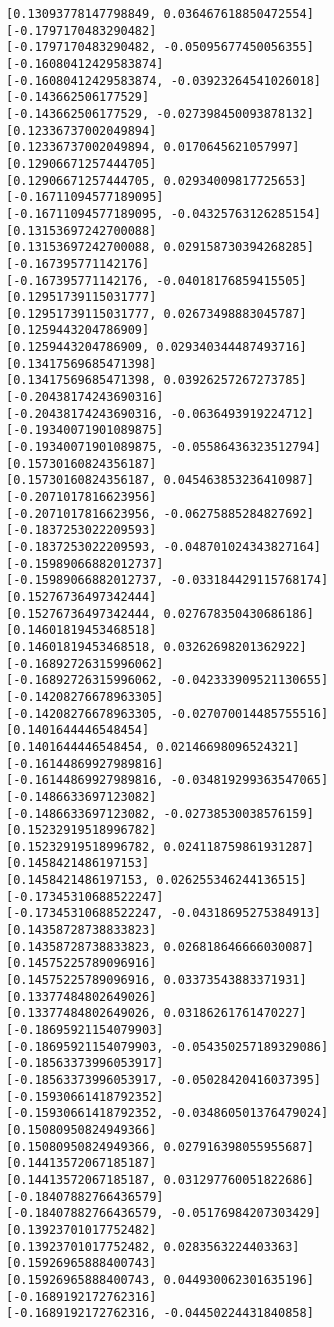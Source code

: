 \documentclass[11pt]{article}
\begin{document}
\begin{Verbatim}[commandchars=\\\{\}]
[0.13093778147798849, 0.036467618850472554]
[-0.1797170483290482]
[-0.1797170483290482, -0.05095677450056355]
[-0.16080412429583874]
[-0.16080412429583874, -0.03923264541026018]
[-0.143662506177529]
[-0.143662506177529, -0.027398450093878132]
[0.12336737002049894]
[0.12336737002049894, 0.0170645621057997]
[0.12906671257444705]
[0.12906671257444705, 0.02934009817725653]
[-0.16711094577189095]
[-0.16711094577189095, -0.04325763126285154]
[0.13153697242700088]
[0.13153697242700088, 0.029158730394268285]
[-0.167395771142176]
[-0.167395771142176, -0.04018176859415505]
[0.12951739115031777]
[0.12951739115031777, 0.02673498883045787]
[0.1259443204786909]
[0.1259443204786909, 0.029340344487493716]
[0.13417569685471398]
[0.13417569685471398, 0.03926257267273785]
[-0.20438174243690316]
[-0.20438174243690316, -0.0636493919224712]
[-0.19340071901089875]
[-0.19340071901089875, -0.05586436323512794]
[0.15730160824356187]
[0.15730160824356187, 0.045463853236410987]
[-0.2071017816623956]
[-0.2071017816623956, -0.06275885284827692]
[-0.1837253022209593]
[-0.1837253022209593, -0.048701024343827164]
[-0.15989066882012737]
[-0.15989066882012737, -0.033184429115768174]
[0.15276736497342444]
[0.15276736497342444, 0.027678350430686186]
[0.14601819453468518]
[0.14601819453468518, 0.03262698201362922]
[-0.16892726315996062]
[-0.16892726315996062, -0.042333909521130655]
[-0.14208276678963305]
[-0.14208276678963305, -0.027070014485755516]
[0.1401644446548454]
[0.1401644446548454, 0.02146698096524321]
[-0.16144869927989816]
[-0.16144869927989816, -0.034819299363547065]
[-0.1486633697123082]
[-0.1486633697123082, -0.02738530038576159]
[0.15232919518996782]
[0.15232919518996782, 0.024118759861931287]
[0.1458421486197153]
[0.1458421486197153, 0.026255346244136515]
[-0.17345310688522247]
[-0.17345310688522247, -0.04318695275384913]
[0.14358728738833823]
[0.14358728738833823, 0.026818646666030087]
[0.14575225789096916]
[0.14575225789096916, 0.03373543883371931]
[0.13377484802649026]
[0.13377484802649026, 0.03186261761470227]
[-0.18695921154079903]
[-0.18695921154079903, -0.054350257189329086]
[-0.18563373996053917]
[-0.18563373996053917, -0.05028420416037395]
[-0.15930661418792352]
[-0.15930661418792352, -0.034860501376479024]
[0.15080950824949366]
[0.15080950824949366, 0.027916398055955687]
[0.14413572067185187]
[0.14413572067185187, 0.031297760051822686]
[-0.18407882766436579]
[-0.18407882766436579, -0.05176984207303429]
[0.13923701017752482]
[0.13923701017752482, 0.0283563224403363]
[0.15926965888400743]
[0.15926965888400743, 0.044930062301635196]
[-0.1689192172762316]
[-0.1689192172762316, -0.04450224431840858]

\end{Verbatim}
\end{document}
